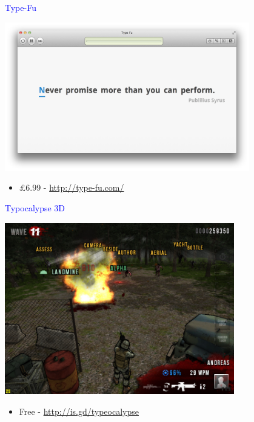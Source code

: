\documentclass[landscape]{slides}
\begin{document}
\begin{slide}

    \textcolor{blue}{\Large{Type-Fu}}

    \centering

    \includegraphics[width=0.8\textwidth]{type-fu-screenshot}

    \begin{itemize}
        \item £6.99 - \url{http://type-fu.com/}
    \end{itemize}

\end{slide}


\begin{slide}

    \textcolor{blue}{\Large{Typocalypse 3D}}

    \centering

    \includegraphics[width=0.75\textwidth]{typocalypse-3d}

    \begin{itemize}
        \item Free - \url{http://is.gd/typeocalypse}
    \end{itemize}

\end{slide}
\end{document}
